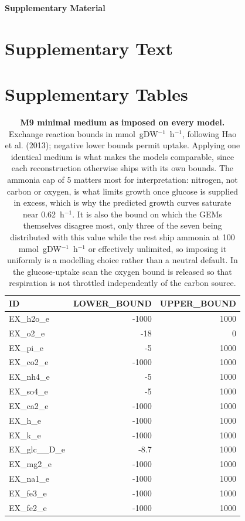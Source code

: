 \documentclass[12pt,a4paper]{article}
\begin{document}
\begin{center}
    {\LARGE \textbf{Supplementary Material}} \\[0.5cm]

\end{center}




\section{Supplementary Text}



\newpage

\section{Supplementary Tables}

\begin{table}[H]
\centering
\caption{\textbf{M9 minimal medium as imposed on every model.} Exchange reaction bounds in mmol~gDW$^{-1}$~h$^{-1}$, following Hao et al. (2013); negative lower bounds permit uptake. Applying one identical medium is what makes the models comparable, since each reconstruction otherwise ships with its own bounds. The ammonia cap of 5 matters most for interpretation: nitrogen, not carbon or oxygen, is what limits growth once glucose is supplied in excess, which is why the predicted growth curves saturate near 0.62~h$^{-1}$. It is also the bound on which the GEMs themselves disagree most, only three of the seven being distributed with this value while the rest ship ammonia at 100 mmol~gDW$^{-1}$~h$^{-1}$ or effectively unlimited, so imposing it uniformly is a modelling choice rather than a neutral default. In the glucose-uptake scan the oxygen bound is released so that respiration is not throttled independently of the carbon source.}
\begin{tabular}{l r r}
\toprule
\textbf{ID} & \textbf{LOWER\_BOUND} & \textbf{UPPER\_BOUND} \\
\midrule
EX\_h2o\_e   & -1000 & 1000 \\
EX\_o2\_e    & -18   & 0    \\
EX\_pi\_e    & -5    & 1000 \\
EX\_co2\_e   & -1000 & 1000 \\
EX\_nh4\_e   & -5    & 1000 \\
EX\_so4\_e   & -5    & 1000 \\
EX\_ca2\_e   & -1000 & 1000 \\
EX\_h\_e     & -1000 & 1000 \\
EX\_k\_e     & -1000 & 1000 \\
EX\_glc\_\_D\_e & -8.7 & 1000 \\
EX\_mg2\_e   & -1000 & 1000 \\
EX\_na1\_e   & -1000 & 1000 \\
EX\_fe3\_e   & -1000 & 1000 \\
EX\_fe2\_e   & -1000 & 1000 \\
\bottomrule
\end{tabular}
\label{tab:exchange_bounds}
\end{table}
\end{document}
